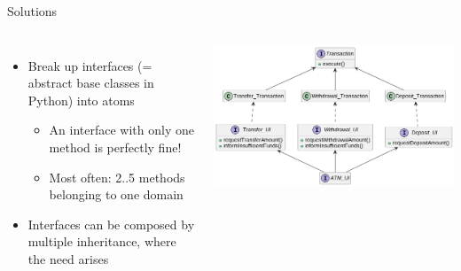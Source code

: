 \begin{frame}{Solutions}
%
\begin{columns}
\begin{itemize}
\item Break up interfaces (= abstract base classes in Python) into atoms
	\begin{itemize}
	\item An interface with only one method is perfectly fine!
	\item Most often: 2..5 methods belonging to one domain
	\end{itemize}
\item Interfaces can be composed by multiple inheritance, where the need arises
\end{itemize}
%
\includegraphics[width=\linewidth]{./gfx/17-uml-atm-isp_applied}
\end{columns}
%
\end{frame}


